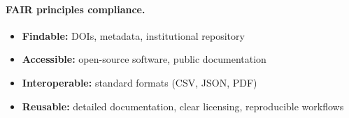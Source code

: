 \paragraph{FAIR principles compliance.}
\begin{itemize}
  \item \textbf{Findable:} DOIs, metadata, institutional repository
  \item \textbf{Accessible:} open-source software, public documentation
  \item \textbf{Interoperable:} standard formats (CSV, JSON, PDF)
  \item \textbf{Reusable:} detailed documentation, clear licensing, reproducible workflows
\end{itemize}
